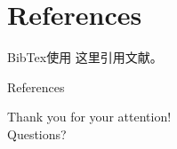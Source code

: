\documentclass[
10pt,
aspectratio=169,
]{beamer}
\begin{document}
\section{References}

\begin{frame}{BibTex使用}
    这里引用文献\cite{9492070}。
\end{frame}

\begin{frame}{References}



\end{frame}
\begin{frame}[plain]
	\vfill
	\centering
	{
		\centering \Huge \color{white} Thank you for your attention!\\[10pt]Questions?
	}
	\vfill
\end{frame}
\end{document}

